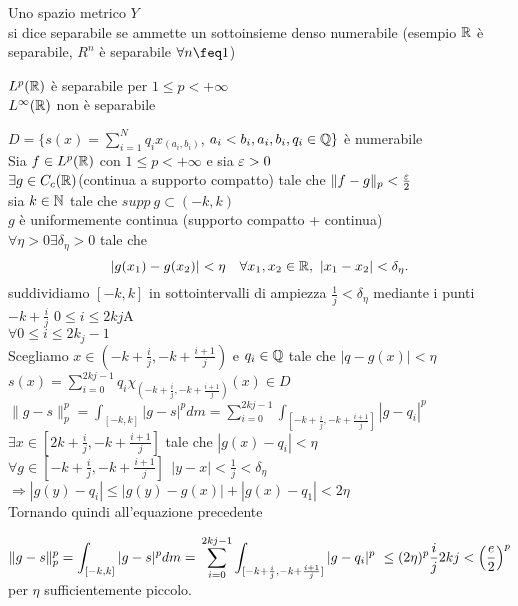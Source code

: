 \documentclass[12px]{article}
\begin{document}
	 \begin{defi}
	 	Uno spazio metrico $Y$\\
		si dice separabile se ammette un sottoinsieme denso numerabile (esempio  $\mathbb{R}$ è separabile, $R^n$ è separabile $\forall n \feq 1$)  \\
	 \end{defi}
	 \begin{teo}
		 $L^p(\mathbb{R})$ è separabile per  $1\leq p < +\infty$\\
		  $L^\infty(\mathbb{R})$ non è separabile
	 \end{teo}
	 \begin{dimo}
		 $D = \{s(x) = \sum^{N}_{i=1}q_ix_{(a_i,b_i)}$, $a_i < b_i, a_i,b_i,q_i\in \mathbb{Q}\}$ è numerabile\\
		 Sia $f\in L^p(\mathbb{R})$ con  $1\leq p < +\infty$ e sia $\varepsilon > 0 $\\
		  $\exists g\in C_c(\mathbb{R}) $(continua a supporto compatto) tale che  $\|f-g\|_p < \frac {\varepsilon} 2$\\
		  sia  $k\in \mathbb{N}$ tale che  $supp \ g\subset (-k,k)$\\
		   $g$ è uniformemente continua \hfill(supporto compatto + continua)\\
		   $\forall \eta > 0 \exists \delta_\eta > 0 $ tale che 
		    \[
		   |g(x_1)-g(x_2)| <\eta \ \ \ \forall x_1,x_2\in \R , \ |x_1-x_2| < \delta_\eta
		   .\] 
		   suddividiamo $[-k,k]$ in sottointervalli di ampiezza  $\frac 1j < \delta_\eta$ mediante i punti  $-k + \frac i j$  $0\leq i \leq 2kj$A\\
		    $\forall 0 \leq i \leq 2k_j -1$\\
		    Scegliamo  $x\in (-k + \frac i j, -k + \frac { i + 1}j)$ e $q_i\in \mathbb{Q}$ tale che  $|q-g(x)| < \eta$\\
		    $s(x) = \sum^{2kj - 1}_{i = 0}q_i\chi_{(-k + \frac  i j, -k + \frac {i+1}j)}(x)\in D$\\
		    $\displaystyle\|g-s\|^p_p = \int_{[-k,k]}|g-s|^pd m = \sum^{2kj -1}_{i=0}\int_{[-k+\frac ij, -k + \frac {i+1}j]}|g-q_i|^p$ \\
		    $\exists x\in [2k + \frac ij, -k + \frac {i+1}j]$ tale che  $|g(x) - q_i| < \eta$\\
		    $\forall g\in [-k + \frac ij, -k + \frac {i + 1}j] \ \ |y-x | < \frac 1 j < \delta_\eta$\\
		     $ \Rightarrow  |g(y)-q_i| \leq |g(y)-g(x)| +|g(x)-q_1| < 2\eta$ \\
		     Tornando quindi all'equazione precedente

		    $\displaystyle\|g-s\|^p_p = \int_{[-k,k]}|g-s|^pd m = \\\sum^{2kj -1}_{i=0}\int_{[-k+\frac ij, -k + \frac {i+1}j]}|g-q_i|^p\ \leq (2\eta)^p\frac ij 2kj < \left(\frac e 2 \right)^p$  per $\eta$ sufficientemente piccolo.
			    
	 \end{dimo}
\end{document}
